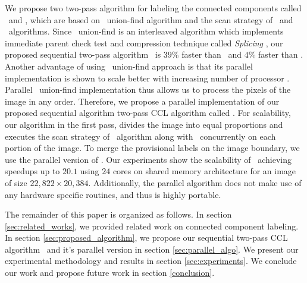 We propose two two-pass algorithm for labeling the connected components called
\aremsp\ and \remsp, which are based on \rems\ union-find algorithm
\cite{Patwary2010_RemSP} and the scan strategy of \arun\ and \lrpc\ algorithms.
Since \rems\ union-find is an interleaved algorithm which implements immediate parent check test and 
compression technique called {\em Splicing} \cite{Patwary2010_RemSP}, our
proposed sequential two-pass algorithm \aremsp\ is $39$\% faster than \lrpc\
and $4$\% faster than \arun.
Another advantage of using \rems\ union-find approach is that its parallel implementation is shown to scale better
with increasing number of processor \cite{Patwary2012_PARemSP}. Parallel \rems\ union-find implementation thus allows us to
process the pixels of the image in any order. Therefore, we propose a parallel implementation of our proposed
sequential algorithm two-pass CCL algorithm called \paremsp. For scalability,
our algorithm in the first pass, divides the image into equal proportions and executes the scan strategy of \arun\ algorithm along with \remsp\
concurrently on each portion of the image. To merge the provisional labels on the image boundary, we use the parallel version
of \remsp \cite{Patwary2012_PARemSP}. Our experiments show
the scalability of \paremsp\ achieving speedups up to $20.1$ using $24$ cores
on shared memory architecture for an image of size $22,822 \times 20,384$.
Additionally, the parallel algorithm does not make use of any hardware specific routines, and thus is highly portable.

The remainder of this paper is organized as follows. In section
\ref{sec:related_works}, we provided related work on connected component labeling.
In section \ref{sec:proposed_algorithm}, we propose our sequential two-pass CCL
algorithm \aremsp\ and it's parallel version in section
\ref{sec:parallel_algo}.
We present our experimental methodology and results in section
\ref{sec:experiments}. We conclude our work and propose future work in section
\ref{conclusion}.


